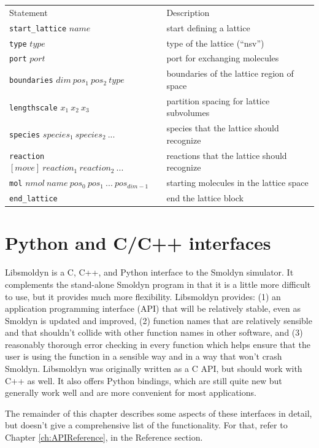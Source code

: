 \documentclass {scrbook}
\newcommand {\ttt} {\texttt}
\begin{document}
\begin{longtable}[c]{ll}
Statement & Description\\
\ttt{start\_lattice} $name$ & start defining a lattice\\
\ttt{type} $type$ & type of the lattice (``nsv'')\\
\ttt{port} $port$ & port for exchanging molecules\\
\ttt{boundaries} $dim\ pos_1\ pos_2\ type$ & boundaries of the lattice region of space\\
\ttt{lengthscale} $x_1\ x_2\ x_3$ & partition spacing for lattice subvolumes\\
\ttt{species} $species_1\ species_2\ ...$ & species that the lattice should recognize\\
\ttt{reaction} $[move]\ reaction_1\ reaction_2\ ...$ & reactions that the lattice should recognize\\
\ttt{mol} $nmol\ name\ pos_0\ pos_1\ ...\ pos_{dim-1}$ & starting molecules in the lattice space\\
\ttt{end\_lattice} & end the lattice block
\end{longtable}


\chapter{Python and C/C++ interfaces}

Libsmoldyn is a C, C++, and Python interface to the Smoldyn simulator. It complements the stand-alone Smoldyn program in that it is a little more difficult to use, but it provides much more flexibility. Libsmoldyn provides: (1) an application programming interface (API) that will be relatively stable, even as Smoldyn is updated and improved, (2) function names that are relatively sensible and that shouldn't collide with other function names in other software, and (3) reasonably thorough error checking in every function which helps ensure that the user is using the function in a sensible way and in a way that won't crash Smoldyn. Libsmoldyn was originally written as a C API, but should work with C++ as well. It also offers Python bindings, which are still quite new but generally work well and are more convenient for most applications.

The remainder of this chapter describes some aspects of these interfaces in detail, but doesn't give a comprehensive list of the functionality. For that, refer to Chapter \ref{ch:APIReference}, in the Reference section.
\end{document}
